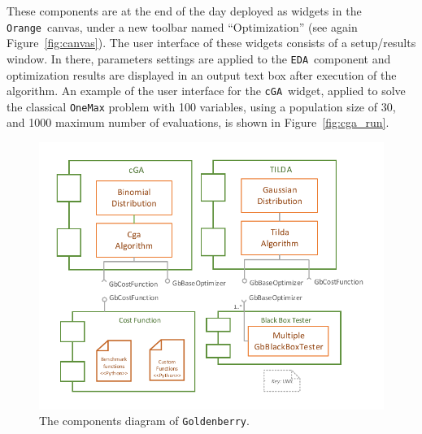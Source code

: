 \documentclass{sig-alternate}
\newcommand{\Orange}{\texttt{Orange}}
\newcommand{\GB}{\texttt{Goldenberry}}
\newcommand{\cGA}{\texttt{cGA}}
\newcommand{\EDA}{\texttt{EDA}}
\newcommand{\figref}[1]{\mbox{Figure \ref{#1}}}
\begin{document}
These components are at the end of the day deployed as widgets in the \Orange~canvas, under a new toolbar named ``Optimization'' (see again \figref{fig:canvas}). The user interface of these widgets consists of a setup/results window. In there, parameters settings are applied to the \EDA~component and optimization results are displayed in an output text box after execution of the algorithm. An example of the user interface for the \cGA~widget, applied to solve the classical \texttt{OneMax} problem with 100 variables, using a population size of 30, and 1000 maximum number of evaluations, is shown in \figref{fig:cga_run}. 

\begin{figure}[H]
	\centering
	\includegraphics[scale=.7]{components} 
	\caption{The components diagram of \GB.}
	\label{fig:components}
\end{figure}
\end{document}
